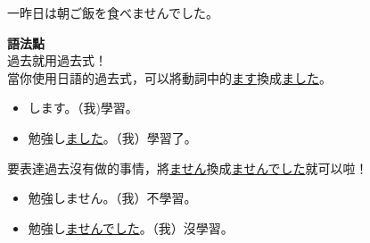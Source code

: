 \begin{itemize}
        一昨日は朝ご飯を食べませんでした。\par
        \textbf{語法點}\\
        過去就用過去式！\\
        當你使用日語的過去式，可以將動詞中的\underline{\textendash ます}換成\underline{\textendash ました}。
        \begin{eg}\leavevmode
            \begin{itemize}
                \item {}します。（我)學習。
                \item 勉強し\underline{ました}。（我）學習了。
            \end{itemize}
        \end{eg}
        要表達過去沒有做的事情，將\underline{\textendash ません}換成\underline{\textendash ませんでした}就可以啦！
        \begin{eg}\leavevmode
            \begin{itemize}
                \item 勉強しません。（我）不學習。
                \item 勉強し\underline{ませんでした}。（我）沒學習。
            \end{itemize}
        \end{eg}
\end{itemize}
\expandafter\string\the\font
